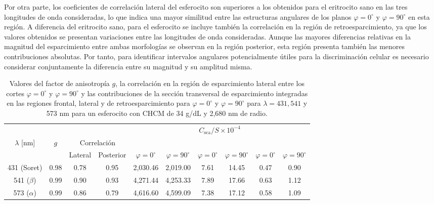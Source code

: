 Por otra parte, los coeficientes de correlación lateral del esferocito son superiores a los obtenidos para el eritrocito sano en las tres longitudes de onda consideradas, lo que indica una mayor similitud entre las estructuras angulares de los planos $\varphi=0^\circ$ y $\varphi=90^\circ$ en esta región. A diferencia del eritrocito sano, para el esferocito se incluye también la correlación en la región de retroesparcimiento, ya que los valores obtenidos se presentan variaciones entre las longitudes de onda consideradas. Aunque las mayores diferencias relativas en la magnitud del esparcimiento entre ambas morfologías se observan en la región posterior, esta región presenta también las menores contribuciones absolutas. Por tanto, para identificar intervalos angulares potencialmente útiles para la discriminación celular es necesario considerar conjuntamente la diferencia entre su magnitud y su amplitud misma.
%
\begin{table}[h!]
	\centering
	{
		\small
		\setlength{\arrayrulewidth}{0.6pt}
		\renewcommand{\arraystretch}{1.1}
		\setlength{\tabcolsep}{4pt}
		
		\begin{tabular}{cccccccccc}
			\hline
			\rowcolor{UNAMrojo0!25!white}
			& & & &
			\multicolumn{6}{c}{$C_{\text{sca}}/S\times 10^{-4}$}\\
			
			\rowcolor{UNAMrojo0!25!white}
			$\lambda$ [nm] &
			$g$ &
			\multicolumn{2}{c}{Correlación} &
			\multicolumn{2}{c}{\raisebox{0.6ex}{Frontal}} &
			\multicolumn{2}{c}{\raisebox{0.6ex}{Lateral}} &
			\multicolumn{2}{c}{\raisebox{0.6ex}{Posterior}}\\
			
			\rowcolor{UNAMrojo0!25!white}
			& &
			Lateral & Posterior &
			$\varphi=0^\circ$ & $\varphi=90^\circ$ &
			$\varphi=0^\circ$ & $\varphi=90^\circ$ &
			$\varphi=0^\circ$ & $\varphi=90^\circ$\\
			\hline
			
			\rowcolor{UNAMrojo0!12!white}
			431 (Soret) & 0.98 & 0.78 & 0.95 &
			2,030.46 & 2,019.00 &
			7.61 & 14.45 & 0.47 & 0.90\\
			
			\rowcolor{UNAMrojo0!3!white}
			541 ($\beta$) & 0.99 & 0.90 & 0.93 &
			4,271.44 & 4,253.33 &
			7.89 & 17.66 & 0.63 & 1.12\\
			
			\rowcolor{UNAMrojo0!12!white}
			573 ($\alpha$) & 0.99 & 0.86 & 0.79 &
			4,616.60 & 4,599.09 &
			7.38 & 17.12 & 0.58 & 1.09\\
			\hline
		\end{tabular}
	}
	
	\caption{Valores del factor de anisotropía $g$, la correlación en la región de esparcimiento lateral entre los cortes $\varphi=0^\circ$ y $\varphi=90^\circ$ y las contribuciones de la sección transversal de esparcimiento integradas en las regiones frontal, lateral y de retroesparcimiento para $\varphi=0^\circ$ y $\varphi=90^\circ$ para $\lambda=431,541$ y 573 nm para un esferocito con CHCM de 34 g/dL y 2,680 nm de radio.}
	
	\label{table:val_esf}
\end{table}


